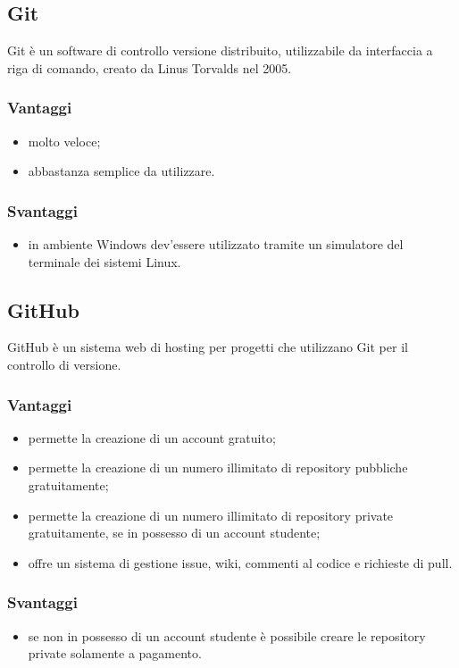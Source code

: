 \documentclass[../Tesi.tex]{subfiles}
\begin{document}
	\subsection{Git}
		Git è un software di controllo versione distribuito, utilizzabile da interfaccia a riga di comando, creato da Linus Torvalds nel 2005.
		\subsubsection{Vantaggi}
			\begin{itemize}
				\item molto veloce;
				\item abbastanza semplice da utilizzare.
			\end{itemize}	
		\subsubsection{Svantaggi}
			\begin{itemize}
				\item in ambiente Windows dev'essere utilizzato tramite un simulatore del terminale dei sistemi Linux.
			\end{itemize}

	\subsection{GitHub}
		GitHub è un sistema web di hosting per progetti che utilizzano Git per il controllo di versione.
		\subsubsection{Vantaggi}
			\begin{itemize}
				\item permette la creazione di un account gratuito;
				\item permette la creazione di un numero illimitato di repository pubbliche gratuitamente;
				\item permette la creazione di un numero illimitato di repository private gratuitamente, se in possesso di un account studente;
				\item offre un sistema di gestione issue, wiki, commenti al codice e richieste di pull.
			\end{itemize}	
		\subsubsection{Svantaggi}
			\begin{itemize}
				\item se non in possesso di un account studente è possibile creare le repository private solamente a pagamento.
			\end{itemize}
\end{document}

